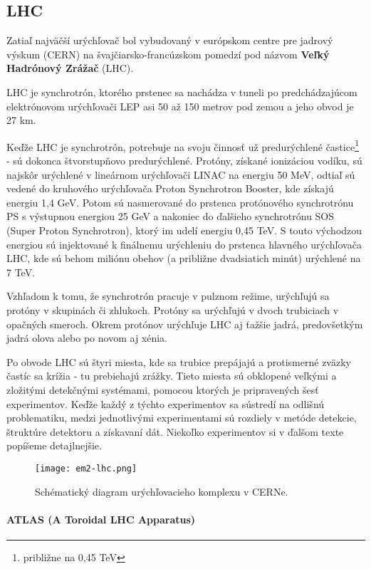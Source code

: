 \documentclass[../../main.tex]{subfiles}
\begin{document}
\subsection{LHC}

Zatiaľ najväčší urýchľovač bol vybudovaný v európskom centre pre jadrový výskum (CERN) na švajčiarsko-francúzskom pomedzí pod názvom \textbf{Veľký Hadrónový Zrážač} (LHC).

LHC je synchrotrón, ktorého prstenec sa nachádza v tuneli po predchádzajúcom elektrónovom urýchľovači LEP asi 50 až 150 metrov pod zemou a jeho obvod je 27 km.

Keďže LHC je synchrotrón, potrebuje na svoju činnosť už predurýchlené častice\footnote{približne na 0,45 TeV} - sú dokonca štvorstupňovo predurýchlené. Protóny, získané ionizáciou vodíku, sú najskôr urýchlené v lineárnom urýchľovači LINAC na energiu 50 MeV, odtiaľ sú vedené do kruhového urýchľovača Proton Synchrotron Booster, kde získajú energiu 1,4 GeV. Potom sú nasmerované do prstenca protónového synchrotrónu PS s výstupnou energiou 25 GeV a nakoniec do ďalšieho synchrotrónu SOS (Super Proton Synchrotron), ktorý im udelí energiu 0,45 TeV. S touto východzou energiou sú injektované k finálnemu urýchleniu do prstenca hlavného urýchľovača LHC, kde sú behom miliónu obehov (a približne dvadsiatich minút) urýchlené na 7 TeV.

Vzhľadom k tomu, že synchrotrón pracuje v pulznom režime, urýchľujú sa protóny v skupinách či zhlukoch. Protóny sa urýchľujú v dvoch trubiciach v opačných smeroch. Okrem protónov urýchľuje LHC aj ťažšie jadrá, predovšetkým jadrá olova alebo po novom aj xénia. 

Po obvode LHC sú štyri miesta, kde sa trubice prepájajú a protismerné zväzky častíc sa krížia - tu prebiehajú zrážky. Tieto miesta sú obklopené veľkými a zložitými detekčnými systémami, pomocou ktorých je pripravených šesť experimentov. Keďže každý z týchto experimentov sa sústredí na odlišnú problematiku, medzi jednotlivými experimentami sú rozdiely v metóde detekcie, štruktúre detektoru a získavaní dát. Niekoľko experimentov si v ďalšom texte popíšeme detajlnejšie.

\begin{figure}[h]
\centering
\texttt{[image: em2-lhc.png]}
\caption{Schématický diagram urýchľovacieho komplexu v CERNe.}
\label{em2:img:lhc}
\end{figure}

\paragraph{ATLAS (A Toroidal LHC Apparatus)}
\end{document}
